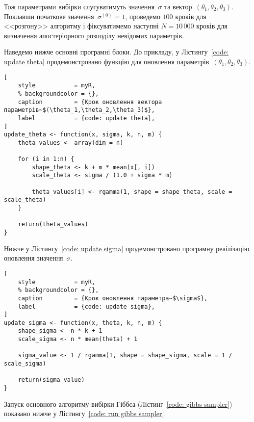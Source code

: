 Тож параметрами вибірки слугуватимуть значення~$\sigma$ та вектор~$\left( \theta_1,\theta_2,\theta_3 \right)$. Поклавши початкове значення~$\sigma^{(0)}=1$, проведемо $100$ кроків для <<розгону>> алгоритму і фіксуватимемо наступні $N=10\,000$ кроків для визначення апостеріорного розподілу невідомих параметрів. 

Наведемо нижче основні програмні блоки. До прикладу, у Лістингу~\ref{code: update theta} продемонстровано функцію для оновлення параметрів~$(\theta_1,\theta_2,\theta_3)$.

\vspace{0.4cm}
\begin{lstlisting}[
    style           = myR,
    % backgroundcolor = {},
    caption         = {Крок оновлення вектора параметрів~$(\theta_1,\theta_2,\theta_3)$},
    label           = {code: update theta},
]
update_theta <- function(x, sigma, k, n, m) {
    theta_values <- array(dim = n)

    for (i in 1:n) {
        shape_theta <- k + m * mean(x[, i])
        scale_theta <- sigma / (1.0 + sigma * m)

        theta_values[i] <- rgamma(1, shape = shape_theta, scale = scale_theta)
    }

    return(theta_values)
}
\end{lstlisting}

\vspace{0.4cm}
Нижче у Лістингу~\ref{code: update sigma} продемонстровано програмну реаілізацію оновлення значення~$\sigma$.

\vspace{0.4cm}
\begin{lstlisting}[
    style           = myR,
    % backgroundcolor = {},
    caption         = {Крок оновлення параметра~$\sigma$},
    label           = {code: update sigma},
]
update_sigma <- function(x, theta, k, n, m) {
    shape_sigma <- n * k + 1
    scale_sigma <- n * mean(theta) + 1

    sigma_value <- 1 / rgamma(1, shape = shape_sigma, scale = 1 / scale_sigma)

    return(sigma_value)
}
\end{lstlisting}

\vspace{0.4cm}
Запуск основного алгоритму вибірки Гіббса (Лістинг~\ref{code: gibbs sampler}) показано нижче у Лістингу~\ref{code: run gibbs sampler}.

